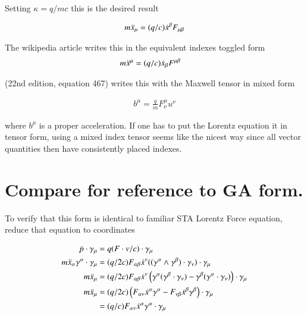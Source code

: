 \documentclass{article}
\begin{document}
Setting $\kappa = q/mc$ this is the desired result

\begin{align*}
m \ddot{x}_\mu &= (q/c) \dot{x}^\beta F_{\mu\beta} \\
\end{align*}

The wikipedia article \cite{wikiLorentzForce} writes this in the equivalent indexes toggled form
\begin{align*}
m \ddot{x}^\mu &= (q/c) \dot{x}_\beta F^{\mu\beta}
\end{align*}

\cite{schiller:mm} (22nd edition, equation 467) writes this with the
Maxwell tensor in mixed form

\begin{align*}
b^\mu = \frac{q}{m} F_\nu^\mu u^\nu
\end{align*}

where $b^\mu$ is a proper acceleration.  If one has to put the Lorentz 
equation it in tensor
form, using a mixed index tensor seems like the nicest way since all
vector quantities then have consistently placed indexes.

%

\section{ Compare for reference to GA form. }

To verify that this form is identical to familiar STA Lorentz Force equation,
reduce that equation to coordinates

\begin{align*}
\dot{p} \cdot \gamma_\mu &= q (F \cdot v/c) \cdot \gamma_\mu \\
m \ddot{x}_\alpha \gamma^\alpha \cdot \gamma_\mu &= (q/2c) F_{\alpha\beta} \dot{x}^\nu
((\gamma^{\alpha} \wedge \gamma^{\beta}) \cdot \gamma_\nu) \cdot \gamma_\mu \\
m \ddot{x}_\mu &=
(q/2c) F_{\alpha\beta} \dot{x}^\nu \left( \gamma^{\alpha} (\gamma^{\beta} \cdot \gamma_\nu) -\gamma^{\beta} (\gamma^{\alpha} \cdot \gamma_\nu) \right) \cdot \gamma_\mu \\
m \ddot{x}_\mu &= 
(q/2c) \left( F_{\alpha\nu} \dot{x}^\alpha \gamma^{\alpha} - F_{\nu\beta} \dot{x}^\beta \gamma^{\beta} \right) \cdot \gamma_\mu \\
&= (q/c) F_{\alpha\nu} \dot{x}^\alpha \gamma^{\alpha} \cdot \gamma_\mu \\
\end{align*}
\end{document}
